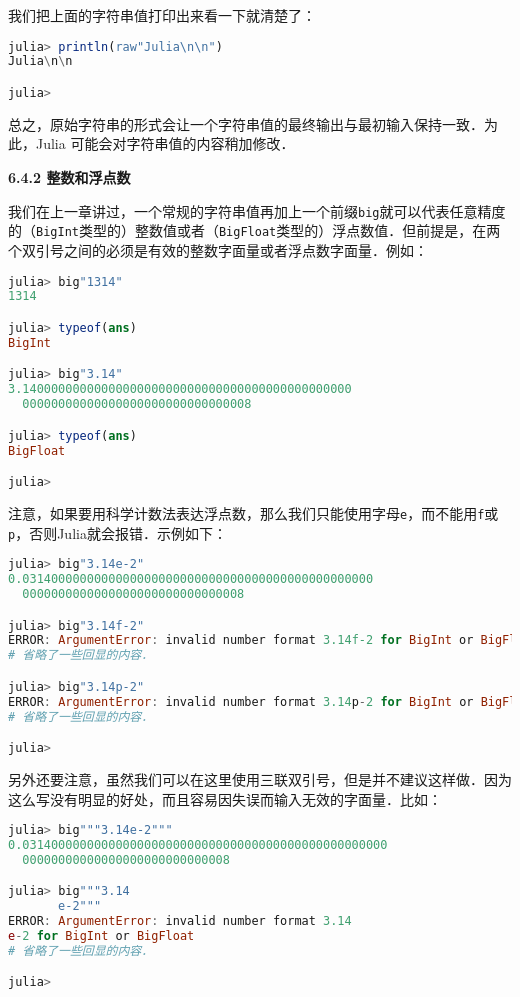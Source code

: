 我们把上面的字符串值打印出来看一下就清楚了：
\begin{lstlisting}[language=julia]
julia> println(raw"Julia\n\n")
Julia\n\n

julia> 
\end{lstlisting}

总之，原始字符串的形式会让一个字符串值的最终输出与最初输入保持一致．为此，Julia 可能会对字符串值的内容稍加修改．

\textbf{6.4.2 整数和浮点数}

我们在上一章讲过，一个常规的字符串值再加上一个前缀\verb|big|就可以代表任意精度的（\verb|BigInt|类型的）整数值或者（\verb|BigFloat|类型的）浮点数值．但前提是，在两个双引号之间的必须是有效的整数字面量或者浮点数字面量．例如：
\begin{lstlisting}[language=julia]
julia> big"1314"
1314

julia> typeof(ans)
BigInt

julia> big"3.14"
3.1400000000000000000000000000000000000000000000
  00000000000000000000000000000008

julia> typeof(ans)
BigFloat

julia> 
\end{lstlisting}

注意，如果要用科学计数法表达浮点数，那么我们只能使用字母\verb|e|，而不能用\verb|f|或\verb|p|，否则Julia就会报错．示例如下：
\begin{lstlisting}[language=julia]
julia> big"3.14e-2"
0.0314000000000000000000000000000000000000000000000
  0000000000000000000000000000008

julia> big"3.14f-2"
ERROR: ArgumentError: invalid number format 3.14f-2 for BigInt or BigFloat
# 省略了一些回显的内容．

julia> big"3.14p-2"
ERROR: ArgumentError: invalid number format 3.14p-2 for BigInt or BigFloat
# 省略了一些回显的内容．

julia> 
\end{lstlisting}

另外还要注意，虽然我们可以在这里使用三联双引号，但是并不建议这样做．因为这么写没有明显的好处，而且容易因失误而输入无效的字面量．比如：
\begin{lstlisting}[language=julia]
julia> big"""3.14e-2"""
0.031400000000000000000000000000000000000000000000000
  00000000000000000000000000008

julia> big"""3.14
       e-2"""
ERROR: ArgumentError: invalid number format 3.14
e-2 for BigInt or BigFloat
# 省略了一些回显的内容．

julia> 
\end{lstlisting}

